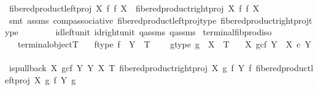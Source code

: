 \begin{isabellebody}
\ {\isachardoublequoteopen}fibered{\isacharunderscore}{\kern0pt}product{\isacharunderscore}{\kern0pt}left{\isacharunderscore}{\kern0pt}proj\ X\ f\ f\ X\ {\isacharequal}{\kern0pt}\ fibered{\isacharunderscore}{\kern0pt}product{\isacharunderscore}{\kern0pt}right{\isacharunderscore}{\kern0pt}proj\ X\ f\ f\ X{\isachardoublequoteclose}\isanewline
\ \ \ \ \isamarkupfalse%
\ {\isacharparenleft}{\kern0pt}smt\ assms{\isacharparenleft}{\kern0pt}{}{\isacharparenright}{\kern0pt}\ comp{\isacharunderscore}{\kern0pt}associative{}\ fibered{\isacharunderscore}{\kern0pt}product{\isacharunderscore}{\kern0pt}left{\isacharunderscore}{\kern0pt}proj{\isacharunderscore}{\kern0pt}type\ fibered{\isacharunderscore}{\kern0pt}product{\isacharunderscore}{\kern0pt}right{\isacharunderscore}{\kern0pt}proj{\isacharunderscore}{\kern0pt}type\isanewline
\ \ \ \ \ \ \ \ id{\isacharunderscore}{\kern0pt}left{\isacharunderscore}{\kern0pt}unit{}\ id{\isacharunderscore}{\kern0pt}right{\isacharunderscore}{\kern0pt}unit{}\ q{}{\isacharunderscore}{\kern0pt}assms\ q{}{\isacharunderscore}{\kern0pt}assms{\isacharparenright}{\kern0pt}\isanewline
{}\isamarkupfalse%
%
\endisatagproof
{\isafoldproof}%
%
\isadelimproof
\isanewline
%
\endisadelimproof
\isanewline
{}\isamarkupfalse%
\ terminal{\isacharunderscore}{\kern0pt}fib{\isacharunderscore}{\kern0pt}prod{\isacharunderscore}{\kern0pt}iso{\isacharcolon}{\kern0pt}\isanewline
\ \ \ {\isachardoublequoteopen}terminal{\isacharunderscore}{\kern0pt}object{\isacharparenleft}{\kern0pt}T{\isacharparenright}{\kern0pt}{\isachardoublequoteclose}\isanewline
\ \ \ f{\isacharunderscore}{\kern0pt}type{\isacharcolon}{\kern0pt}\ {\isachardoublequoteopen}f\ {\isacharcolon}{\kern0pt}\ Y\ {\isasymrightarrow}\ T{\isachardoublequoteclose}\ \isanewline
\ \ \ g{\isacharunderscore}{\kern0pt}type{\isacharcolon}{\kern0pt}\ {\isachardoublequoteopen}g\ {\isacharcolon}{\kern0pt}\ X\ {\isasymrightarrow}\ T{\isachardoublequoteclose}\isanewline
\ \ \ {\isachardoublequoteopen}{\isacharparenleft}{\kern0pt}X\ \isactrlbsub g\isactrlesub {\isasymtimes}\isactrlsub c\isactrlbsub f\isactrlesub \ Y{\isacharparenright}{\kern0pt}\ {\isasymcong}\ X\ {\isasymtimes}\isactrlsub c\ Y{\isachardoublequoteclose}\isanewline
%
\isadelimproof
%
\endisadelimproof
%
\isatagproof
{}\isamarkupfalse%
\ {\isacharminus}{\kern0pt}\ \isanewline
\ \ \isamarkupfalse%
\ {\isachardoublequoteopen}{\isacharparenleft}{\kern0pt}is{\isacharunderscore}{\kern0pt}pullback\ {\isacharparenleft}{\kern0pt}X\ \isactrlbsub g\isactrlesub {\isasymtimes}\isactrlsub c\isactrlbsub f\isactrlesub \ Y{\isacharparenright}{\kern0pt}\ Y\ X\ T\ {\isacharparenleft}{\kern0pt}fibered{\isacharunderscore}{\kern0pt}product{\isacharunderscore}{\kern0pt}right{\isacharunderscore}{\kern0pt}proj\ X\ g\ f\ Y{\isacharparenright}{\kern0pt}\ f\ {\isacharparenleft}{\kern0pt}fibered{\isacharunderscore}{\kern0pt}product{\isacharunderscore}{\kern0pt}left{\isacharunderscore}{\kern0pt}proj\ X\ g\ f\ Y{\isacharparenright}{\kern0pt}\ g{\isacharparenright}{\kern0pt}{\isachardoublequoteclose}\isanewline

\end{isabellebody}
